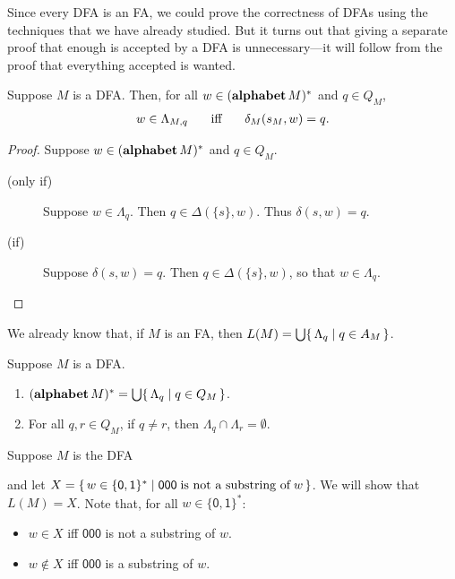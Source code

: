 Since every DFA is an FA, we could prove the correctness of DFAs
using the techniques that we have already studied.
But it turns out that giving a separate proof that enough is accepted
by a DFA is unnecessary---it will follow from the proof that
everything accepted is wanted.

\begin{proposition}
Suppose $M$ is a DFA.  Then, for all $w\in(\mathbf{alphabet}\,M)^*$ and $q\in Q_M$,
\begin{gather*}
w\in\Lambda_{M,q} \quad\mathrel{\;\;\allowbreak\mbox{iff}\allowbreak\;\;}\quad \delta_M(s_M,w) = q .
\end{gather*}
\end{proposition}

\begin{proof}
Suppose $w\in(\mathbf{alphabet}\,M)^*$ and $q\in Q_M$.
\begin{description}
\item[\quad(only if)] Suppose $w\in\Lambda_q$.  Then
  $q\in\Delta(\{s\},w)$.  Thus $\delta(s,w) = q$.

\item[\quad(if)] Suppose $\delta(s,w) = q$.  Then
  $q\in\Delta(\{s\},w)$, so that $w\in\Lambda_q$.
\end{description}
\end{proof}

We already know that, if $M$ is an FA, then
$L(M)=\bigcup\{ \, \Lambda_q \mid q\in A_M \, \}$.

\begin{proposition}
Suppose $M$ is a DFA.
\begin{enumerate}[\quad(1)]
\item $(\mathbf{alphabet}\,M)^* = \bigcup\{ \, \Lambda_q \mid q\in Q_M \, \}$.

\item For all $q,r\in Q_M$, if $q\neq r$, then
  $\Lambda_q\cap\Lambda_r=\emptyset$.
\end{enumerate}
\end{proposition}

Suppose $M$ is the DFA
\begin{center}

\end{center}
and let $X=\{ \, w\in\{\mathsf{0,1}\}^* \mid \mathsf{000}\;\allowbreak\mbox{is not a
    substring of}\allowbreak\;w \, \}$.  We will show that $L(M)=X$.  Note that, for all
$w\in\{\mathsf{0,1}\}^*$:
\begin{itemize}
\item $w\in X$ iff $\mathsf{000}$ is not a substring of $w$.

\item $w\not\in X$ iff $\mathsf{000}$ is a substring of $w$.
\end{itemize}


